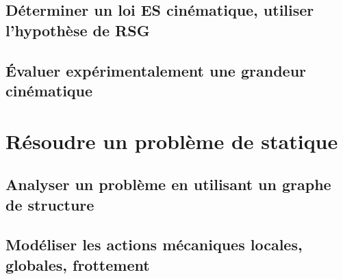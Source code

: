 \graphicspath{{\repStyle/png/}{../CIN/CIN-03-Transmetteurs/38_Treuil/images/}} 
 
 
\graphicspath{{\repStyle/png/}{../CIN/CIN-03-Transmetteurs/91_PorteAvion/images/}} 
 
 
\graphicspath{{\repStyle/png/}{../CIN/CIN-03-Transmetteurs/92_Colossus/images/}} 
 
 
\graphicspath{{\repStyle/png/}{../CIN/CIN-03-Transmetteurs/93_Lokomat/images/}} 
 
 
\graphicspath{{\repStyle/png/}{../CIN/CIN-03-Transmetteurs/94_Taurus/images/}} 
 
 
\clearpage 
\newpage 
\section{Déterminer un loi ES cinématique, utiliser l'hypothèse de RSG} 
\clearpage 
\newpage 
\section{Évaluer expérimentalement une grandeur cinématique} 
\clearpage 
\newpage 
\setchapterpreamble[u]{\margintoc} 
\chapter{Résoudre un problème de statique} 
\section{Analyser un problème en utilisant un graphe de structure} 
\clearpage 
\newpage 
\section{Modéliser les actions mécaniques locales, globales, frottement} 
\graphicspath{{\repStyle/png/}{../STAT/STAT-02-Frottement/532_MAM_Frottement_Cylindre/images/}} 
 
 
\graphicspath{{\repStyle/png/}{../STAT/STAT-02-Frottement/533_MAM_Frottement_Cylindre/images/}} 
 
 
